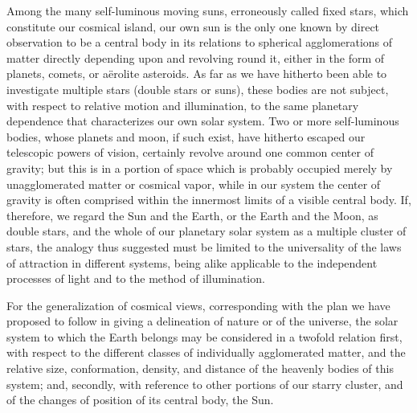 Among the many self-luminous moving suns, erroneously called fixed stars, which constitute our cosmical island, our own sun is the only one known by direct observation to be a central body in its relations to spherical agglomerations of matter directly depending upon and revolving round it, either in the form of planets, comets, or aërolite asteroids. As far as we have hitherto been able to investigate multiple stars (double stars or suns), these bodies are not subject, with respect to relative motion and illumination, to the same planetary dependence that characterizes our own solar system. Two or more self-luminous bodies, whose planets and moon, if such exist, have hitherto escaped our telescopic powers of vision, certainly revolve around one common center of gravity; but this is in a portion of space which is probably occupied merely by unagglomerated matter or cosmical vapor, while in our system the center of gravity is often comprised within the innermost limits of a visible central body. If, therefore, we regard the Sun and the Earth, or the Earth and the Moon, as double stars, and the whole of our planetary solar system as a multiple cluster of stars, the analogy thus suggested must be limited to the universality of the laws of attraction in different systems, being alike applicable to the independent processes of light and to the method of illumination.

For the generalization of cosmical views, corresponding with the plan we have proposed to follow in giving a delineation of nature or of the universe, the solar system to which the Earth belongs may be considered in a twofold relation  first, with respect to the different classes of individually agglomerated matter, and the relative size, conformation, density, and distance of the heavenly bodies of this system; and, secondly, with reference to other portions of our starry cluster, and of the changes of position of its central body, the Sun.